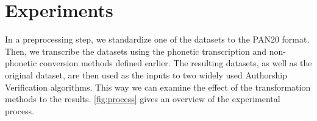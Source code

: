 \chapter{Experiments}\label{experiments}
In a preprocessing step, we standardize one of the datasets to the PAN20 format.
Then, we transcribe the datasets using the phonetic transcription and non-phonetic conversion methods defined earlier.
The resulting datasets, as well as the original dataset, are then used as the inputs to two widely used Authorship Verification algorithms.
This way we can examine the effect of the transformation methods to the results.
\ref{fig:process} gives an overview of the experimental process.
%

